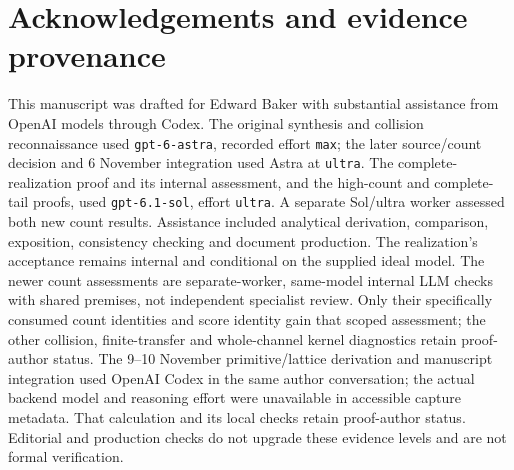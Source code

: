 \documentclass[11pt]{article}
\theoremstyle{definition}
\theoremstyle{remark}
\numberwithin{equation}{section}
\begin{document}
\section*{Acknowledgements and evidence provenance}
This manuscript was drafted for Edward Baker with substantial assistance
from OpenAI models through Codex. The original synthesis and collision
reconnaissance used \texttt{gpt-6-astra}, recorded effort \texttt{max};
the later source/count decision and 6 November integration used Astra at
\texttt{ultra}. The complete-realization proof and its internal assessment,
and the high-count and complete-tail proofs, used \texttt{gpt-6.1-sol},
effort \texttt{ultra}. A separate Sol/ultra worker assessed both new
count results. Assistance included analytical derivation, comparison,
exposition, consistency checking and document production. The realization's
acceptance remains internal and conditional on the supplied ideal model.
The newer count assessments are separate-worker, same-model internal LLM
checks with shared premises, not independent specialist review. Only their
specifically consumed count identities and score identity gain that scoped
assessment; the other collision, finite-transfer and whole-channel kernel
diagnostics retain proof-author status. The 9--10 November primitive/lattice
derivation and manuscript integration used OpenAI Codex in the same author
conversation; the actual backend model and reasoning effort were unavailable
in accessible capture metadata. That calculation and its local checks
retain proof-author status. Editorial and production checks do
not upgrade these evidence levels and are not formal verification.
\begingroup\small


\endgroup
\end{document}
